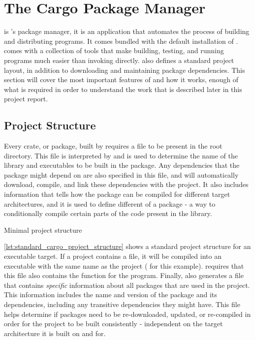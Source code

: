 
\section{The Cargo Package Manager}
\label{sec:cargo}

{\cargo} is {\rust}'s package manager, it is an application that automates the process of building and distributing {\rust} programs.
It comes bundled with the default installation of {\rust}.
{\cargo} comes with a collection of tools that make building, testing, and running {\rust} programs much easier than invoking {\rustc} directly.
{\cargo} also defines a standard {\rust} project layout, in addition to downloading and maintaining package dependencies.
This section will cover the most important features of {\cargo} and how it works, enough of what is required in order to understand the work that is described later in this project report.

\subsection{Project Structure}
\label{ssub:project_structure}

Every crate, or package, built by {\cargo} requires a  file to be present in the root directory.
This file is interpreted by {\cargo} and is used to determine the name of the library and executables to be built in the package.
Any dependencies that the package might depend on are also specified in this file, and {\cargo} will automatically download, compile, and link these dependencies with the project.
It also includes information that tells {\cargo} how the package can be compiled for different target architectures, and it is used to define different  of a package - a way to conditionally compile certain parts of the code present in the library.

\begin{listing}
\caption{Minimal {\cargo} project structure}
\label{lst:standard_cargo_project_structure}
\end{listing}

\autoref{lst:standard_cargo_project_structure} shows a standard {\cargo} project structure for an executable target.
If a project contains a  file, it will be compiled into an executable with the same name as the project ( for this example).
{\cargo} requires that this file also contains the {\main} function for the program.
Finally, {\cargo} also generates a  file that contains \emph{specific} information about all packages that are used in the project.
This information includes the name and version of the package and its dependencies, including any transitive dependencies they might have.
This file helps {\cargo} determine if packages need to be re-downloaded, updated, or re-compiled in order for the project to be built consistently - independent on the target architecture it is built on and for.

